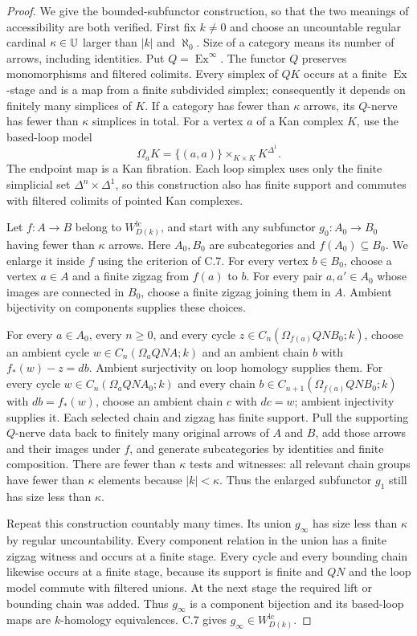 \begin{proof}
We give the bounded-subfunctor construction, so that the two meanings
of accessibility are both verified. First fix $k\ne0$ and choose an
uncountable regular cardinal $\kappa\in\mathbb U$ larger than $|k|$ and
$\aleph_0$. Size of a category means its number of arrows, including
identities. Put $Q=\operatorname{Ex}^{\infty}$. The functor $Q$
preserves monomorphisms and filtered colimits. Every simplex of $QK$
occurs at a finite $\operatorname{Ex}$-stage and is a map from a
finite subdivided simplex; consequently it depends on finitely many
simplices of $K$. If a category has fewer than $\kappa$ arrows, its
$Q$-nerve has fewer than $\kappa$ simplices in total. For a vertex
$a$ of a Kan complex $K$, use the based-loop model
\[
 \Omega_aK=\{(a,a)\}\times_{K\times K}K^{\Delta^1}.
\]
The endpoint map is a Kan fibration. Each loop simplex uses only the
finite simplicial set $\Delta^n\times\Delta^1$, so this construction
also has finite support and commutes with filtered colimits of
pointed Kan complexes.

Let $f:A\to B$ belong to $W_{D(k)}^{\mathrm{lc}}$, and start with
any subfunctor $g_0:A_0\to B_0$ having fewer than $\kappa$ arrows.
Here $A_0,B_0$ are subcategories and $f(A_0)\subseteq B_0$.
We enlarge it inside $f$ using the criterion of C.7. For every
vertex $b\in B_0$, choose a vertex $a\in A$ and a finite zigzag
from $f(a)$ to $b$. For every pair $a,a'\in A_0$ whose images are
connected in $B_0$, choose a finite zigzag joining them in $A$.
Ambient bijectivity on components supplies these choices.

For every $a\in A_0$, every $n\geq0$, and every cycle
$z\in C_n(\Omega_{f(a)}QN B_0;k)$, choose an ambient cycle
$w\in C_n(\Omega_aQN A;k)$ and an ambient chain $b$ with
$f_*(w)-z=db$. Ambient surjectivity on loop homology supplies them.
For every cycle $w\in C_n(\Omega_aQN A_0;k)$ and every chain
$b\in C_{n+1}(\Omega_{f(a)}QN B_0;k)$ with $db=f_*(w)$, choose
an ambient chain $c$ with $dc=w$; ambient injectivity supplies it.
Each selected chain and zigzag has finite support. Pull the
supporting $Q$-nerve data back to finitely many original arrows of
$A$ and $B$, add those arrows and their images under $f$, and
generate subcategories by identities and finite composition.
There are fewer than $\kappa$ tests and witnesses: all relevant
chain groups have fewer than $\kappa$ elements because
$|k|<\kappa$. Thus the enlarged subfunctor $g_1$ still has size
less than $\kappa$.

Repeat this construction countably many times. Its union $g_\infty$
has size less than $\kappa$ by regular uncountability. Every
component relation in the union has a finite zigzag witness and
occurs at a finite stage. Every cycle and every bounding chain
likewise occurs at a finite stage, because its support is finite
and $QN$ and the loop model commute with filtered unions. At the
next stage the required lift or bounding chain was added. Thus
$g_\infty$ is a component bijection and its based-loop maps are
$k$-homology equivalences. C.7 gives
$g_\infty\in W_{D(k)}^{\mathrm{lc}}$.


\end{proof}
